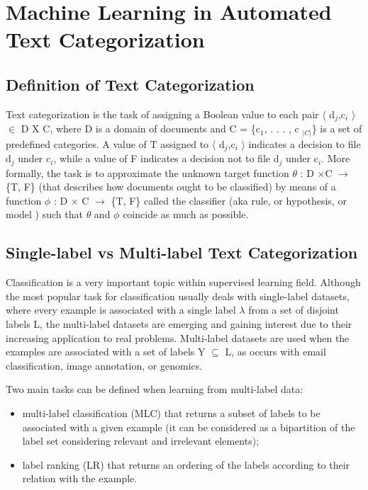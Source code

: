 \section{Machine Learning in Automated Text Categorization}
\label{sec:ml_text_categ}

\subsection{Definition of Text Categorization}
Text categorization is the task of assigning a Boolean value to each pair 
$\langle$ d$_{j}$,c$_{i}$ $\rangle$ $\in$ D X C,  where D is a domain of documents 
and C = \{c$_{1}$, . . . , c $_{|C|}$\} is a set of predefined categories. A value 
of T assigned to $\langle$ d$_{j}$,c$_{i}$ $\rangle$ indicates a decision to 
file d$_{j}$ under c$_{i}$, while a value of F indicates a decision not to 
file d$_{j}$ under c$_{i}$. More formally, the task is to approximate the unknown 
target function $\theta$ : D ×C $\rightarrow$ \{T, F\} (that describes how documents 
ought to be classified) by means of a function $\phi$ : D × C $\rightarrow$ \{T, F\} 
called the classifier (aka rule, or hypothesis, or model ) such that $\theta$ and 
$\phi$ coincide as much as possible.\cite{Sebastiani2002}

\subsection{Single-label vs Multi-label Text Categorization}
Classification is a very important topic within supervised learning field. 
Although the most popular task for classification usually deals with 
single-label datasets, where every example is associated with a single label 
$\lambda$ from a set of disjoint labels L, the multi-label datasets are emerging 
and gaining interest due to their increasing application to real problems. Multi-label 
datasets are used when the examples are associated with a set of labels Y 
$\subseteq$ L, as occurs with email classification, image annotation, or genomics.

Two main tasks can be defined when learning from multi-label data: 
\begin{itemize}
  \item multi-label classification (MLC) that returns a subset of labels to be 
  associated with a given example (it can be considered as a bipartition of the 
  label set considering relevant and irrelevant elements);
  \item label ranking (LR) that returns an ordering of the labels according to 
  their relation with the example. \cite{Carmona2011}
\end{itemize}

